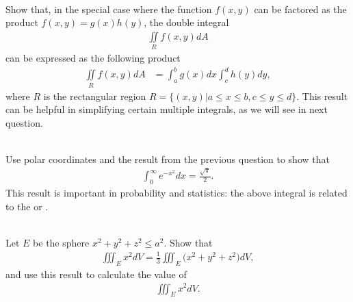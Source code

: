 \item %
 \\
Show that, in the special case where the function $f(x,y)$ can be factored as the product $f(x,y) = g(x)h(y)$, the double integral 
\begin{align*}
   \iint\limits_{R} f(x,y) dA 
\end{align*}
can be expressed as the following product 
\begin{align*}
   \iint\limits_{R} f(x,y) dA 
  & = \int_a^b g(x) dx \int_c^d h(y) dy  ,
\end{align*}
where $R$ is the rectangular region $R=\{(x,y) | a \le x \le b, c\le y \le d\}$. 
This result can be helpful in simplifying certain multiple integrals, as we will see in next question.
\item %
 \\
Use polar coordinates and the result from the previous question to show that 
\begin{align*}
   \int_{0}^{\infty} e^{-x^2} dx
   = \frac{\sqrt{\pi}}{2}.
\end{align*}
This result is important in probability and statistics: the above integral is related to the  or . 
\item %
 \\
Let $E$ be the sphere $x^2+y^2+z^2\le a^2$. Show that 
\begin{align*}
  \iiint_E x^2 dV = \frac{1}{3} \iiint_E \Big(x^2 +y^2+z^2\Big)dV,
\end{align*}
and use this result to calculate the value of 
\begin{align*}
  \iiint_E x^2 dV.
\end{align*}
\EEN %
